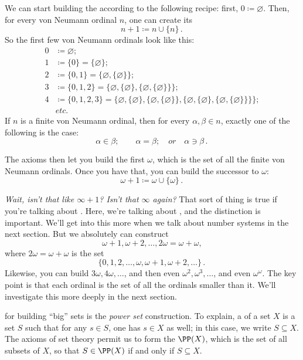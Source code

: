 \begin{exm}
	We can start building the  according to the following recipe:
	first, $0\coloneq\varnothing$.
	Then, for every von Neumann ordinal $n$, one can create its 
	\[
		n+1\coloneq n\cup\{n\} \period
	\]
	So the first few von Neumann ordinals look like this:
	\begin{align*}
		0 & \coloneq \varnothing;\\
		1 & \coloneq \{0\}=\{\varnothing\};\\
		2 & \coloneq \{0,1\}=\{\varnothing,\{\varnothing\}\};\\
		3 & \coloneq \{0,1,2\}=\{\varnothing,\{\varnothing\},\{\varnothing,\{\varnothing\}\}\};\\
		4 & \coloneq \{0,1,2,3\}=\{\varnothing,\{\varnothing\},\{\varnothing,\{\varnothing\}\},\{\varnothing,\{\varnothing\},\{\varnothing,\{\varnothing\}\}\}\};\\
		  & \textit{etc.}
	\end{align*}
	If $n$ is a finite von Neumann ordinal, then for every $\alpha,\beta\in n$, exactly one of the following is the case:
	\[
		\alpha\in\beta \semicolon \qquad \alpha=\beta \semicolon \quad \textit{or} \quad \alpha \ni \beta \period	
	\]
\end{exm}

The axioms then let you build the first  $\omega$, which is the set of all the finite von Neumann ordinals.
Once you have that, you can build the successor to $\omega$:
\[
	\omega+1\coloneq\omega\cup\{\omega\} \period
\]

\emph{Wait, isn't that like $\infty+1$? Isn't that $\infty$ again?}
That sort of thing is true if you're talking about .
Here, we're talking about , and the distinction is important.
We'll get into this more when we talk about number systems in the next section.
But we absolutely can construct
\[
	\omega+1,\omega+2,\dots,2\omega=\omega+\omega \comma
\]
where $2\omega=\omega+\omega$ is the set
\[
	\{0,1,2,\dots,\omega,\omega+1,\omega+2,\dots\}\period
\]
Likewise, you can build $3\omega,4\omega,\dots$, and then even $\omega^2,\omega^3,\dots$, and even $\omega^\omega$.
The key point is that each ordinal is the set of all the ordinals smaller than it.
We'll investigate this more deeply in the next section.

 for building \enquote{big} sets is the \emph{power set} construction.
To explain, a  of a set $X$ is a set $S$ such that for any $s\in S$, one has $s\in X$ as well;
in this case, we write $S\subseteq X$.
The axioms of set theory permit us to form the  $\PP(X)$, which is the set of all subsets of $X$, so that $S\in\PP(X)$ if and only if $S\subseteq X$.

